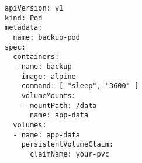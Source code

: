 \begin{verbatim}
apiVersion: v1
kind: Pod
metadata:
  name: backup-pod
spec:
  containers:
  - name: backup
    image: alpine
    command: [ "sleep", "3600" ]
    volumeMounts:
    - mountPath: /data
      name: app-data
  volumes:
  - name: app-data
    persistentVolumeClaim:
      claimName: your-pvc
\end{verbatim}